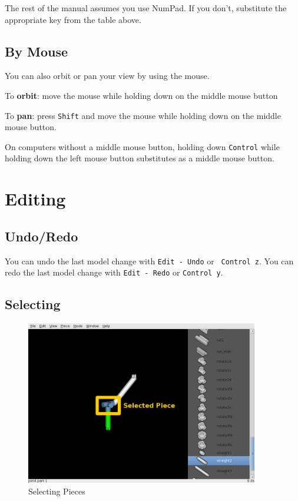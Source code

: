 \documentclass[12pt]{report}
\begin{document}
The rest of the manual assumes you use NumPad.  If you don't,
substitute the appropriate key from the table above.

\subsection{By Mouse}

You can also orbit or pan your view by using the mouse.

\begin{list}{}{}
  \item To \textbf{orbit}: move the mouse while holding down on the
    middle mouse button
  \item To \textbf{pan}: press {\tt Shift} and move the mouse while
    holding down on the middle mouse button.
\end{list}

On computers without a middle mouse button, holding down {\tt Control}
while holding down the left mouse button substitutes as a middle mouse
button.

\section{Editing}

\subsection{Undo/Redo}

You can undo the last model change with {\tt Edit - Undo} or {\tt
  Control z}.  You can redo the last model change with {\tt Edit -
  Redo} or {\tt Control y}.

\subsection{Selecting}

\begin{figure}[h]
\begin{center}
\includegraphics[width=4.0in]{doc_images/manual_selecting.png}
\caption{Selecting Pieces}
\label{Selecting}
\end{center}
\end{figure}
\end{document}
